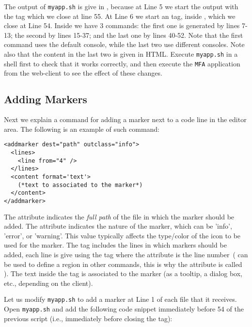 \medskip
\noindent
The output of \texttt{myapp.sh} is give in \eiol, because at Line 5 we
start the output with the tag  which we close at line 55.
%
At Line 6 we start an  tag, inside , which
we close at Line 54.
%
Inside  we have 3  commands:
%
the first one is generated by lines 7-13; the second by lines 15-37;
and the last one by lines 40-52.
%
Note that the first command uses the default console, while the last
two use different consoles. Note also that the content in the last two
is given in HTML. 
%
Execute \texttt{myapp.sh} in a shell first to check that it works
correctly, and then execute the \texttt{MFA} application from the
web-client to see the effect of these changes.

\subsection{Adding Markers}

Next we explain a command for adding a marker next to a code line in
the editor area. The following is an example of such command:

\medskip
\begin{lstlisting}
<addmarker dest="path" outclass="info">
  <lines>
    <line from="4" />
  </lines>
  <content format='text'>
    (*text to associated to the marker*)
  </content>
</addmarker>
\end{lstlisting}

\medskip
\noindent
The attribute  indicates the \emph{full path} of the file in
which the marker should be added.
%
The attribute  indicates the nature of the marker, which
can be 'info', 'error', or 'warning'. This value typically affects the
type/color of the icon to be used for the marker.
%
The tag  includes the lines in which markers should be
added, each line is give using the tag  where the 
attribute is the line number~( can be used to define a
region in other commands, this is why the attribute is called
).
%
The text inside the  tag is associated to the marker (as
a tooltip, a dialog box, etc., depending on the client).

Let us modify \texttt{myapp.sh} to add a marker at Line 1 of each file
that it receives. Open \texttt{myapp.sh} and add the following code
snippet immediately before 54 of the previous script (i.e.,
immediately before closing the  tag):

